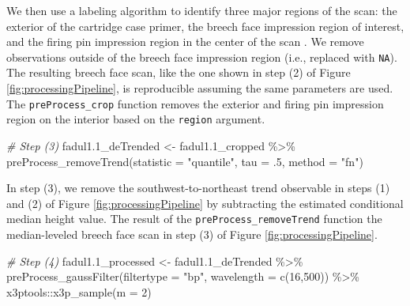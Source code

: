 \documentclass[11pt,]{isuthesis}
\newenvironment{Shaded}{\begin{snugshade}}{\end{snugshade}}
\newcommand{\AttributeTok}[1]{\textcolor[rgb]{0.77,0.63,0.00}{#1}}
\newcommand{\CommentTok}[1]{\textcolor[rgb]{0.56,0.35,0.01}{\textit{#1}}}
\newcommand{\DecValTok}[1]{\textcolor[rgb]{0.00,0.00,0.81}{#1}}
\newcommand{\FloatTok}[1]{\textcolor[rgb]{0.00,0.00,0.81}{#1}}
\newcommand{\FunctionTok}[1]{\textcolor[rgb]{0.00,0.00,0.00}{#1}}
\newcommand{\NormalTok}[1]{#1}
\newcommand{\OtherTok}[1]{\textcolor[rgb]{0.56,0.35,0.01}{#1}}
\newcommand{\SpecialCharTok}[1]{\textcolor[rgb]{0.00,0.00,0.00}{#1}}
\newcommand{\StringTok}[1]{\textcolor[rgb]{0.31,0.60,0.02}{#1}}
\begin{document}
We then use a labeling algorithm to identify three major regions of the scan: the exterior of the cartridge case primer, the breech face impression region of interest, and the firing pin impression region in the center of the scan \citep{hesselink_concurrent_2001, imager}.
We remove observations outside of the breech face impression region (i.e., replaced with \texttt{NA}).
The resulting breech face scan, like the one shown in step (2) of Figure \ref{fig:processingPipeline}, is reproducible assuming the same parameters are used.
The \texttt{preProcess\_crop} function removes the exterior and firing pin impression region on the interior based on the \texttt{region} argument.

\begin{Shaded}
\begin{Highlighting}[]
\CommentTok{\# Step (3)}
\NormalTok{fadul1}\FloatTok{.1}\NormalTok{\_deTrended }\OtherTok{\textless{}{-}}\NormalTok{ fadul1}\FloatTok{.1}\NormalTok{\_cropped }\SpecialCharTok{\%\textgreater{}\%}
  \FunctionTok{preProcess\_removeTrend}\NormalTok{(}\AttributeTok{statistic =} \StringTok{"quantile"}\NormalTok{, }\AttributeTok{tau =}\NormalTok{ .}\DecValTok{5}\NormalTok{, }\AttributeTok{method =} \StringTok{"fn"}\NormalTok{)}
\end{Highlighting}
\end{Shaded}

In step (3), we remove the southwest-to-northeast trend observable in steps (1) and (2) of Figure \ref{fig:processingPipeline} by subtracting the estimated conditional median height value.
The result of the \texttt{preProcess\_removeTrend} function the median-leveled breech face scan in step (3) of Figure \ref{fig:processingPipeline}.

\begin{Shaded}
\begin{Highlighting}[]
\CommentTok{\# Step (4)}
\NormalTok{fadul1}\FloatTok{.1}\NormalTok{\_processed }\OtherTok{\textless{}{-}}\NormalTok{ fadul1}\FloatTok{.1}\NormalTok{\_deTrended }\SpecialCharTok{\%\textgreater{}\%}
  \FunctionTok{preProcess\_gaussFilter}\NormalTok{(}\AttributeTok{filtertype =} \StringTok{"bp"}\NormalTok{, }\AttributeTok{wavelength =} \FunctionTok{c}\NormalTok{(}\DecValTok{16}\NormalTok{,}\DecValTok{500}\NormalTok{)) }\SpecialCharTok{\%\textgreater{}\%}
\NormalTok{  x3ptools}\SpecialCharTok{::}\FunctionTok{x3p\_sample}\NormalTok{(}\AttributeTok{m =} \DecValTok{2}\NormalTok{)}
\end{Highlighting}
\end{Shaded}
\end{document}
